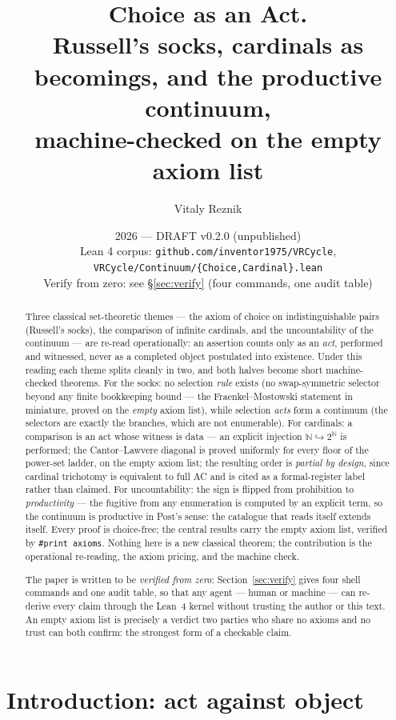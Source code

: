 \documentclass[11pt]{article}
\title{\textbf{Choice as an Act.}\\[2pt]
\large Russell's socks, cardinals as becomings, and the productive
continuum,\\ machine-checked on the empty axiom list}
\author{Vitaly Reznik}
\date{2026 --- DRAFT v0.2.0 (unpublished)\\[2pt]
\small Lean 4 corpus: \texttt{github.com/inventor1975/VRCycle},
\texttt{VRCycle/Continuum/\{Choice,Cardinal\}.lean}\\
\small Verify from zero: see \S\ref{sec:verify} (four commands, one audit table)}
\theoremstyle{remark}
\newcommand{\N}{\mathbb{N}}
\begin{document}
\maketitle

\begin{abstract}
Three classical set-theoretic themes --- the axiom of choice on
indistinguishable pairs (Russell's socks), the comparison of infinite
cardinals, and the uncountability of the continuum --- are re-read
operationally: an assertion counts only as an \emph{act}, performed and
witnessed, never as a completed object postulated into existence.  Under
this reading each theme splits cleanly in two, and both halves become
short machine-checked theorems.  For the socks: no selection \emph{rule}
exists (no swap-symmetric selector beyond any finite bookkeeping bound
--- the Fraenkel--Mostowski statement in miniature, proved on the
\emph{empty} axiom list), while selection \emph{acts} form a continuum
(the selectors are exactly the branches, which are not enumerable).  For
cardinals: a comparison is an act whose witness is data --- an explicit
injection $\N \hookrightarrow 2^{\N}$ is performed; the Cantor--Lawvere
diagonal is proved uniformly for every floor of the power-set ladder, on
the empty axiom list; the resulting order is \emph{partial by design},
since cardinal trichotomy is equivalent to full AC and is cited as a
formal-register label rather than claimed.  For uncountability: the sign
is flipped from prohibition to \emph{productivity} --- the fugitive from
any enumeration is computed by an explicit term, so the continuum is
productive in Post's sense: the catalogue that reads itself extends
itself.  Every proof is choice-free; the central results carry the empty
axiom list, verified by \texttt{\#print axioms}.  Nothing here is a new
classical theorem; the contribution is the operational re-reading, the
axiom pricing, and the machine check.

The paper is written to be \emph{verified from zero}: Section~\ref{sec:verify}
gives four shell commands and one audit table, so that any agent ---
human or machine --- can re-derive every claim through the Lean~4 kernel
without trusting the author or this text.  An empty axiom list is
precisely a verdict two parties who share no axioms and no trust can
both confirm: the strongest form of a checkable claim.
\end{abstract}

\section{Introduction: act against object}
\end{document}
